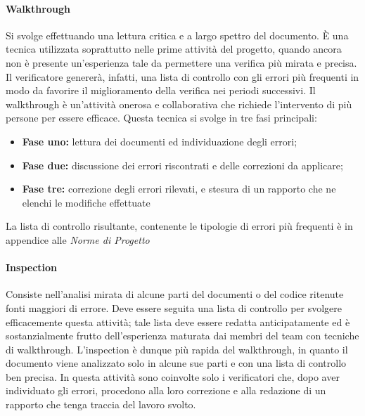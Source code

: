     \paragraph{Walkthrough}
    Si svolge effettuando una lettura critica e a largo spettro del documento.
È una tecnica utilizzata soprattutto nelle prime attività del progetto, quando ancora
non è presente un'esperienza tale da permettere una verifica più mirata e precisa.
Il verificatore genererà, infatti, una lista di controllo con gli errori più frequenti
in modo da favorire il miglioramento della verifica nei periodi successivi.
Il walkthrough è un'attività onerosa e collaborativa che richiede l'intervento di
più persone per essere efficace. Questa tecnica si svolge in tre fasi principali:
\begin{itemize}
\item \textbf{Fase uno:} lettura dei documenti ed individuazione degli errori;
\item \textbf{Fase due:} discussione dei errori riscontrati e delle correzioni da applicare;
\item \textbf{Fase tre:} correzione degli errori rilevati, e stesura di un rapporto che ne elenchi le modifiche effettuate
\end{itemize}

La lista di controllo risultante, contenente le tipologie di errori più frequenti è in appendice alle
\emph{Norme di Progetto \VersioneNP{}}

    \paragraph{Inspection}
	Consiste nell'analisi mirata di alcune parti del documenti o del codice ritenute fonti maggiori di errore. Deve essere seguita una lista di controllo per svolgere efficacemente questa attività; tale lista deve essere redatta anticipatamente ed è sostanzialmente frutto dell'esperienza maturata dai membri del team con tecniche di walkthrough.
L'inspection è dunque più rapida del walkthrough, in quanto il documento viene
analizzato solo in alcune sue parti e con una lista di controllo ben precisa. In questa
attività sono coinvolte solo i verificatori che, dopo aver individuato gli errori, procedono
alla loro correzione e alla redazione di un rapporto che tenga traccia del lavoro svolto.

